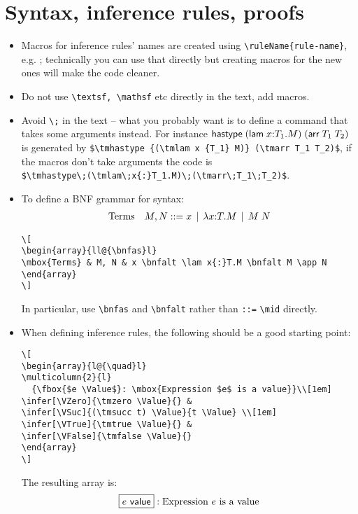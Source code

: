 \documentclass[12pt]{article}
\begin{document}
\section{Syntax, inference rules, proofs}
\begin{itemize}
\item Macros for inference rules' names are created using \verb#\ruleName{rule-name}#, e.g. ; technically you can use that directly but creating macros for the new ones will make the code cleaner.
\item Do not use \verb#\textsf, \mathsf# etc directly in the text, add macros.
\item Avoid \verb#\;# in the text -- what you probably want is to define a command that takes some arguments instead. For instance $\textsf{hastype}\;(\textsf{lam}\;x{:}T_1.M)\;(\textsf{arr}\;T_1\;T_2)$ is generated by \verb#$\tmhastype {(\tmlam x {T_1} M)} (\tmarr T_1 T_2)$#, if the macros don't take arguments the code is\\
\verb#$\tmhastype\;(\tmlam\;x{:}T_1.M)\;(\tmarr\;T_1\;T_2)$#.
\item To define a BNF grammar for syntax:
\[
\begin{array}{ll@{\bnfas}l}
\mbox{Terms} & M, N & x \bnfalt \lam x{:}T.M \bnfalt M \app N
\end{array}
\]
\begin{verbatim}
\[
\begin{array}{ll@{\bnfas}l}
\mbox{Terms} & M, N & x \bnfalt \lam x{:}T.M \bnfalt M \app N
\end{array}
\]
\end{verbatim}
In particular, use \verb#\bnfas# and \verb#\bnfalt# rather than \verb#::=# \verb#\mid# directly.
\item When defining inference rules, the following should be a good starting point:
\begin{verbatim}
\[
\begin{array}{l@{\quad}l}
\multicolumn{2}{l}
  {\fbox{$e \Value$}: \mbox{Expression $e$ is a value}}\\[1em]
\infer[\VZero]{\tmzero \Value}{} &
\infer[\VSuc]{(\tmsucc t) \Value}{t \Value} \\[1em]
\infer[\VTrue]{\tmtrue \Value}{} &
\infer[\VFalse]{\tmfalse \Value}{}
\end{array}
\]
\end{verbatim}
The resulting array is:
\[
\begin{array}{l@{\quad}l}
\multicolumn{2}{l}{\fbox{$e \Value$}: \mbox{Expression $e$ is a value}}\\[1em]

\end{array}\]
\end{itemize}
\end{document}
